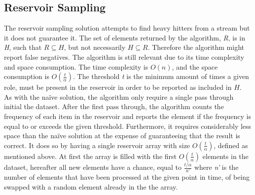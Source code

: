 \subsection{Reservoir Sampling}
The reservoir sampling solution attempts to find heavy hitters from a stream but it does not guarantee it. The set of elements returned by the algorithm, \textit{R}, is in \textit{H}, such that
\begin{math}
	R \subseteq H
\end{math}, but not necessarily 
\begin{math}
	H \subseteq R
\end{math}. Therefore the algorithm might report false negatives.
The algorithm is still relevant due to its time complexity and space consumption. The time complexity is \(O(n)\), and the space consumption is \(O(\frac{t}{\alpha})\). The threshold \textit{t} is the minimum amount of times a given role, must be present in the reservoir in order to be reported as included in \(H\). \\

As with the naïve solution, the algorithm only require a single pass through initial the dataset. After the first pass through, the algorithm counts the frequency of each item in the reservoir and reports the element if the frequency is equal to or exceeds the given threshold.
Furthermore, it requires considerably less space than the naïve solution at the expense of guaranteeing that the result is correct. It does so by having a single reservoir array with size \(O(\frac{t}{\alpha})\), defined as mentioned above. At first the array is filled with the first \(O(\frac{t}{\alpha})\) elements in the dataset, hereafter all new elements have a chance, equal to 
\begin{math}
	\frac{t/\alpha}{n'}
\end{math} where \textit{n'} is the number of elements that have been processed at the given point in time,
 of being swapped with a random element already in the the array.
 
